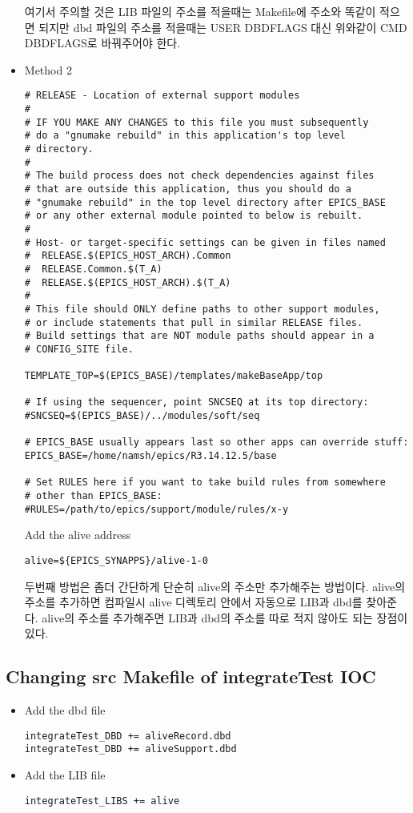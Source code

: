 \documentclass[11pt
  , a4paper
  , article
  , oneside
]{memoir}
\begin{document}
\begin{itemize}
\begin{lstlisting}[style=termstyle]
\end{lstlisting}
여기서 주의할 것은 LIB 파일의 주소를 적을때는 Makefile에 주소와 똑같이 적으면 되지만 dbd 파일의 주소를 
적을때는  USER DBDFLAGS 대신 위와같이 CMD DBDFLAGS로 바꿔주어야 한다.
\item Method 2
\begin{lstlisting}[style=termstyle]
# RELEASE - Location of external support modules
#
# IF YOU MAKE ANY CHANGES to this file you must subsequently
# do a "gnumake rebuild" in this application's top level
# directory.
#
# The build process does not check dependencies against files
# that are outside this application, thus you should do a
# "gnumake rebuild" in the top level directory after EPICS_BASE
# or any other external module pointed to below is rebuilt.
#
# Host- or target-specific settings can be given in files named
#  RELEASE.$(EPICS_HOST_ARCH).Common
#  RELEASE.Common.$(T_A)
#  RELEASE.$(EPICS_HOST_ARCH).$(T_A)
#
# This file should ONLY define paths to other support modules,
# or include statements that pull in similar RELEASE files.
# Build settings that are NOT module paths should appear in a
# CONFIG_SITE file.

TEMPLATE_TOP=$(EPICS_BASE)/templates/makeBaseApp/top

# If using the sequencer, point SNCSEQ at its top directory:
#SNCSEQ=$(EPICS_BASE)/../modules/soft/seq

# EPICS_BASE usually appears last so other apps can override stuff:
EPICS_BASE=/home/namsh/epics/R3.14.12.5/base

# Set RULES here if you want to take build rules from somewhere
# other than EPICS_BASE:
#RULES=/path/to/epics/support/module/rules/x-y
\end{lstlisting}
Add the alive address
\begin{lstlisting}[style=termstyle]
alive=${EPICS_SYNAPPS}/alive-1-0
\end{lstlisting}
두번째 방법은 좀더 간단하게 단순히 alive의 주소만 추가해주는 방법이다. alive의 주소를 추가하면 컴파일시 alive 디렉토리 안에서 자동으로 LIB과 dbd를 찾아준다. alive의 주소를 추가해주면 LIB과 dbd의 주소를 따로 적지 않아도 되는 장점이 있다. 
\end{itemize}
\subsection{Changing src Makefile of integrateTest IOC}
\begin{itemize}

	\item Add the dbd file
	\begin{lstlisting}[style=termstyle]
integrateTest_DBD += aliveRecord.dbd   
integrateTest_DBD += aliveSupport.dbd
\end{lstlisting}
	\item Add the LIB file
	\begin{lstlisting}[style=termstyle]
integrateTest_LIBS += alive
\end{lstlisting}
\end{itemize}
\end{document}
